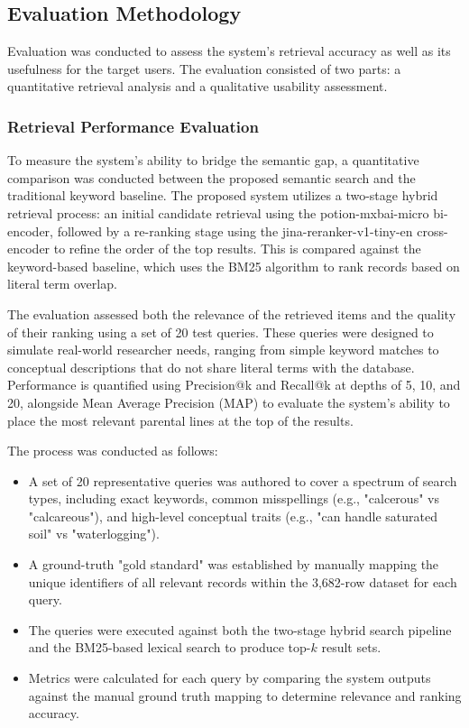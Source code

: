 \documentclass[journal]{./IEEE/IEEEtran}
\begin{document}
\subsection{Evaluation Methodology}
Evaluation was conducted to assess the system's retrieval accuracy as well as its usefulness for the target users. The evaluation consisted of two parts: a quantitative retrieval analysis and a qualitative usability assessment.

\subsubsection{Retrieval Performance Evaluation}
To measure the system's ability to bridge the semantic gap, a quantitative comparison was conducted between the proposed semantic search and the traditional keyword baseline. The proposed system utilizes a two-stage hybrid retrieval process: an initial candidate retrieval using the potion-mxbai-micro bi-encoder, followed by a re-ranking stage using the jina-reranker-v1-tiny-en cross-encoder to refine the order of the top results. This is compared against the keyword-based baseline, which uses the BM25 algorithm to rank records based on literal term overlap.

The evaluation assessed both the relevance of the retrieved items and the quality of their ranking using a set of 20 test queries. These queries were designed to simulate real-world researcher needs, ranging from simple keyword matches to conceptual descriptions that do not share literal terms with the database. Performance is quantified using Precision@k and Recall@k at depths of 5, 10, and 20, alongside Mean Average Precision (MAP) to evaluate the system’s ability to place the most relevant parental lines at the top of the results.

The process was conducted as follows:
\begin{itemize}
    \item A set of 20 representative queries was authored to cover a spectrum of search types, including exact keywords, common misspellings (e.g., "calcerous" vs "calcareous"), and high-level conceptual traits (e.g., "can handle saturated soil" vs "waterlogging").
    \item A ground-truth "gold standard" was established by manually mapping the unique identifiers of all relevant records within the 3,682-row dataset for each query.
    \item The queries were executed against both the two-stage hybrid search pipeline and the BM25-based lexical search to produce top-$k$ result sets.
    \item Metrics were calculated for each query by comparing the system outputs against the manual ground truth mapping to determine relevance and ranking accuracy.
\end{itemize}
\end{document}

